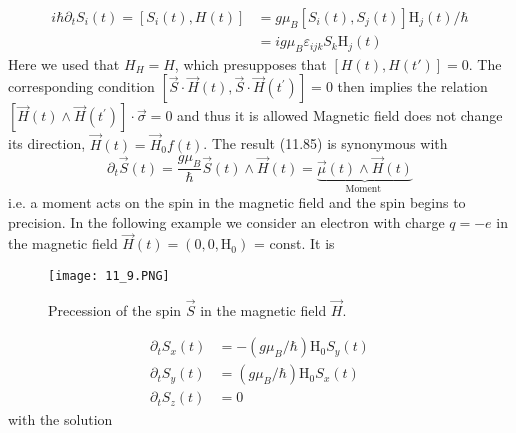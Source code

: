\begin{equation}
\begin{aligned} i \hbar \partial_{t} S_{i}(t)=\left[S_{i}(t), H(t)\right] &=g \mu_{B}\left[S_{i}(t), S_{j}(t)\right] \mathrm{H}_{j}(t) / \hbar \\ &=i g \mu_{B} \varepsilon_{i j k} S_{k} \mathrm{H}_{j}(t) \end{aligned}
\end{equation}
Here we used that $H_H = H$, which presupposes that $[H (t), H (t')] = 0$. The corresponding condition $\left[\vec{S} \cdot \vec{H}(t), \vec{S} \cdot \vec{H}\left(t^{\prime}\right)\right]=0$ then implies the relation $\left[\vec{H}(t) \wedge \vec{H}\left(t^{\prime}\right)\right] \cdot \vec{\sigma}=0$ and thus it is allowed Magnetic field does not change its direction, $\vec{H}(t)=\vec{H}_{0} f(t)$. The result (11.85) is synonymous with
\begin{equation}
    \partial_{t} \vec{S}(t)=\frac{g \mu_{B}}{\hbar} \vec{S}(t) \wedge \vec{H}(t)=\underbrace{\vec{\mu}(t) \wedge \vec{H}(t)}_{\text {Moment }}
    \end{equation}
i.e. a moment acts on the spin in the magnetic field and the spin begins to precision. In the following example we consider an electron with charge $q = −e$ in the magnetic field $\vec{H}(t)=\left(0,0, \mathrm{H}_{0}\right)$ = const. It is
\begin{figure}[ht]
    \begin{minipage}{0.5\textwidth}
        \centering
        \texttt{[image: 11\_9.PNG]}
    \end{minipage}
    \begin{minipage}{0.5\textwidth}
        \caption{Precession of the spin $\vec{S}$ in the magnetic field $\vec{H}$.}
    \end{minipage}
\end{figure}
\begin{equation}
\begin{aligned} \partial_{t} S_{x}(t) &=-\left(g \mu_{B} / \hbar\right) \mathrm{H}_{0} S_{y}(t) \\ \partial_{t} S_{y}(t) &=\left(g \mu_{B} / \hbar\right) \mathrm{H}_{0} S_{x}(t) \\ \partial_{t} S_{z}(t) &=0 \end{aligned}
\end{equation}
with the solution
